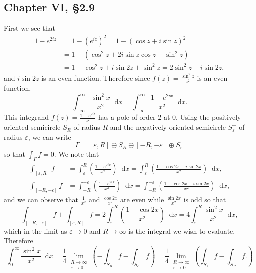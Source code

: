 \documentclass{article}
\newcommand\dif{\mathop{}\!\mathrm{d}}
\begin{document}
\subsection*{Chapter VI, \S 2.9}
First we see that
\begin{align*}
   1 - e^{2 i z}
&= 1 - (e^{iz})^2
 = 1 - (\cos z + i \sin z)^2 \\
&= 1 - (\cos^2 z + 2 i \sin z \cos z - \sin^2 z) \\
&= 1 - \cos^2 z + i \sin 2z + \sin^2 z
 = 2 \sin^2 z + i \sin 2z,
\end{align*}
and $i \sin 2z$ is an even function. Therefore since
$f(z) = \frac{\sin^2 z}{z^2}$ is an even function,
$$
  \int_{-\infty}^\infty
    \frac{\sin^2 x}{x^2}
    \dif x
= \int_{-\infty}^\infty
    \frac{1 - e^{2ix}}{x^2}
    \dif x.
$$
This integrand $f(z) = \frac{1 - e^{2 i z}}{z^2}$
has a pole of order 2 at 0.
Using the positively oriented semicircle $S_R$ of radius $R$
and the negatively oriented semicircle $S_\varepsilon^{-}$ of radius
$\varepsilon$, we can write
$$
  \Gamma
= [\varepsilon, R] \oplus
  S_R \oplus
  [-R, -\varepsilon] \oplus
  S_\varepsilon^{-}
$$
so that $\int_\Gamma f = 0$. We note that
\begin{align*}
   \int_{[\varepsilon, R]} f
&= \int_\varepsilon^R
     \left(
       \frac{1 - e^{2ix}}
            {x^2}
     \right)
     \dif x
  = \int_\varepsilon^R
      \left(
        \frac{1 - \cos 2x - i \sin 2x}
             {x^2}
      \right)
      \dif x, \\
   \int_{[-R, -\varepsilon]} f
&= \int_{-R}^{-\varepsilon}
     \left(
       \frac{1 - e^{2ix}}
            {x^2}
     \right)
     \dif x
  = \int_{-R}^{-\varepsilon}
      \left(
        \frac{1 - \cos 2x - i \sin 2x}
             {x^2}
      \right)
      \dif x,
\end{align*}
and we can observe that $\frac{1}{x^2}$ and
$\frac{\cos 2x}{x^2}$ are even while $\frac{\sin 2x}{x^2}$ is
odd so that
$$
  \int_{[-R, -\varepsilon]} f
+ \int_{[\varepsilon, R]} f
= 2
  \int_{\varepsilon}^{R}
    \left(
      \frac{1 - \cos 2x}{x^2}
    \right)
    \dif x
= 4
  \int_\varepsilon^R
    \frac{\sin^2 x}{x^2}
    \dif x,
$$
which in the limit as $\varepsilon \to 0$ and $R \to \infty$ is
the integral we wish to evaluate. Therefore
$$
  \int_0^\infty
    \frac{\sin^2 x}{x^2}
    \dif x
= \frac{1}{4}
  \lim_{\substack{R \to \infty \\ \varepsilon \to 0}}
  \left(
    -\int_{S_R} f
    -\int_{S_\varepsilon^{-}} f
  \right)
= \frac{1}{4}
  \lim_{\substack{R \to \infty \\ \varepsilon \to 0}}
  \left(
    \int_{S_\varepsilon} f
  - \int_{S_R} f.
  \right)
$$
\end{document}

